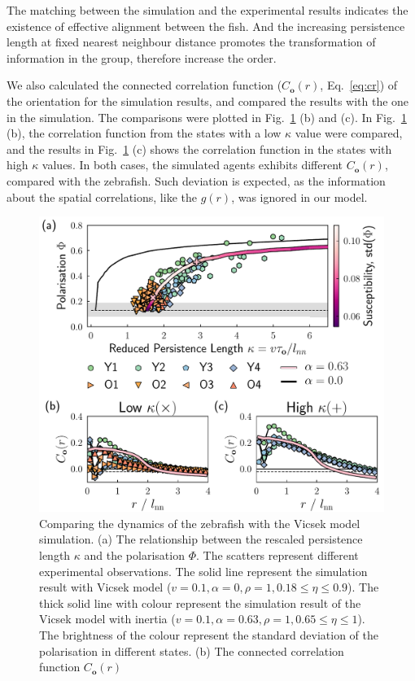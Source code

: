 \documentclass[11pt,twoside]{report}
\begin{document}
The matching between the simulation and the experimental results indicates the existence of effective alignment between the fish. And the increasing persistence length at fixed nearest neighbour distance promotes the transformation of information in the group, therefore increase the order. 

We also calculated the connected correlation function ($C_\mathbf{o}(r)$, Eq.~\ref{eq:cr}) of the orientation for the simulation results, and compared the results with the one in the simulation. The comparisons were plotted in Fig.~\ref{fig:model-dynamics} (b) and (c). In Fig.~\ref{fig:model-dynamics} (b), the correlation function from the states with a low $\kappa$ value were compared, and the results in Fig.~\ref{fig:model-dynamics} (c) shows the correlation function in the states with high $\kappa$ values. In both cases, the simulated agents exhibits different $C_\mathbf{o}(r)$, compared with the zebrafish. Such deviation is expected, as the information about the spatial correlations, like the $g(r)$, was ignored in our model.

\begin{figure}
  \includegraphics[width=\linewidth]{model-dynamics}
  \caption[Comparing the dynamics of the zebrafish with the Vicsek model simulation]{
  Comparing the dynamics of the zebrafish with the Vicsek model simulation.
  (a) The relationship between the rescaled persistence length $\kappa$ and the polarisation $\Phi$. The scatters represent different experimental observations. The solid line represent the simulation result with Vicsek model ($v=0.1, \alpha=0, \rho=1, 0.18 \le \eta \le 0.9$). The thick solid line with colour represent the simulation result of the Vicsek model with inertia ($v=0.1, \alpha=0.63, \rho=1, 0.65 \le \eta \le 1$). The brightness of the colour represent the standard deviation of the polarisation in different states.
  (b) The connected correlation function $C_\mathbf{o}(r)$
  }
  \label{fig:model-dynamics}
\end{figure}
\end{document}
